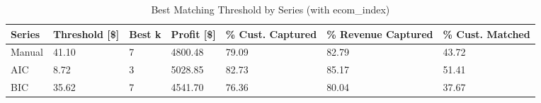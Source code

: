 \begin{table}[ht]
\centering
\caption{Best Matching Threshold by Series (with ecom\_index)} 
\label{tab:series_max}
\begin{tabular}{>{\centering\let\newline\\\arraybackslash\hspace{0pt}}m{1.50cm}>{\centering\let\newline\\\arraybackslash\hspace{0pt}}m{2.00cm}>{\centering\let\newline\\\arraybackslash\hspace{0pt}}m{1.50cm}>{\centering\let\newline\\\arraybackslash\hspace{0pt}}m{2.00cm}>{\centering\let\newline\\\arraybackslash\hspace{0pt}}m{2.00cm}>{\centering\let\newline\\\arraybackslash\hspace{0pt}}m{2.00cm}>{\centering\let\newline\\\arraybackslash\hspace{0pt}}m{2.00cm}}
  \hline
Series & Threshold [\$] & Best k & Profit [\$] & \% Cust. Captured & \% Revenue Captured & \% Cust. Matched \\ 
  \hline
Manual & 41.10 &   7 & 4800.48 & 79.09 & 82.79 & 43.72 \\ 
  AIC & 8.72 &   3 & 5028.85 & 82.73 & 85.17 & 51.41 \\ 
  BIC & 35.62 &   7 & 4541.70 & 76.36 & 80.04 & 37.67 \\ 
   \hline
\end{tabular}
\end{table}
